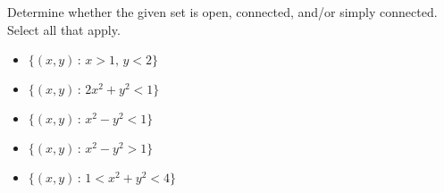 \documentclass{ximera}
\begin{document}
\begin{problem}
Determine whether the given set is open, connected, and/or simply connected. Select all that apply.
\begin{itemize}
\item $\{(x,y)\,:\,x>1,\,y<2\}$
\begin{selectAll}
  \end{selectAll}
\item $\{(x,y)\,:\,2x^2+y^2<1\}$
\begin{selectAll}
  \end{selectAll}
  \item $\{(x,y)\,:\,x^2-y^2<1\}$
\begin{selectAll}
  \end{selectAll}
  \item $\{(x,y)\,:\,x^2-y^2>1\}$
\begin{selectAll}
  \end{selectAll}
  \item $\{(x,y)\,:\,1<x^2+y^2<4\}$
\begin{selectAll}
  \end{selectAll}
\end{itemize}
\end{problem}
\end{document}
